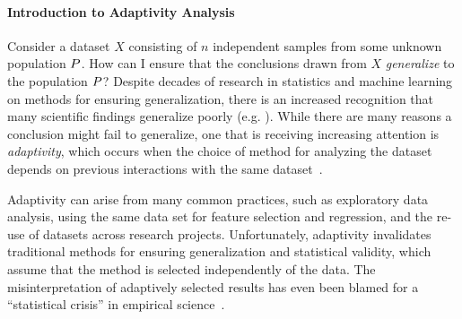 \paragraph*{Introduction to Adaptivity Analysis}
Consider a dataset $X$ consisting of $n$ independent samples from some unknown population $P$.  How can I ensure that the conclusions drawn from $X$ \emph{generalize} to the population $P$?  Despite decades of research in statistics and machine learning on methods for ensuring generalization, there is an increased recognition that many scientific findings generalize poorly (e.g. 
\cite{Ioannidis05,GelmanL13}
).  While there are many reasons a conclusion might fail to generalize, one that is receiving increasing attention is \emph{adaptivity}, which occurs when the choice of method for analyzing the dataset depends on previous interactions with the same dataset~\cite{GelmanL13}.

 Adaptivity can arise from many common practices, such as exploratory data analysis, using the same data set for feature selection and regression, and the re-use of datasets across research projects.  Unfortunately, adaptivity invalidates traditional methods for ensuring generalization and statistical validity, which assume that the method is selected independently of the data. The misinterpretation of adaptively selected results has even been blamed for a ``statistical crisis'' in empirical science~\cite{GelmanL13}.

